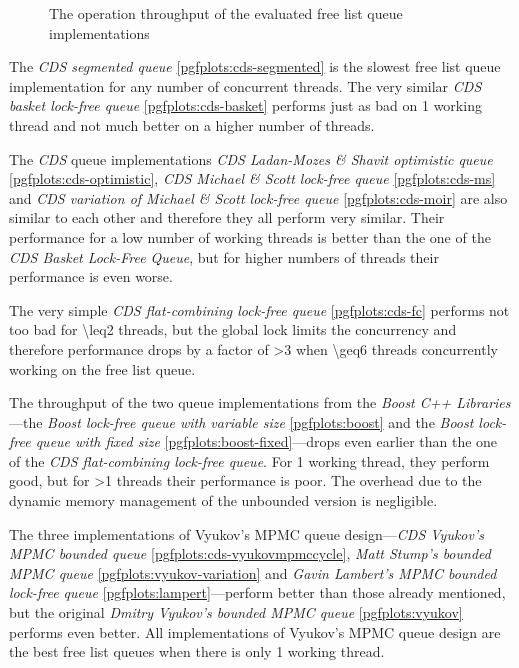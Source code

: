 \begin{@empty}
\begin{figure}[ht!]
{
        }
        \caption{The operation throughput of the evaluated free list queue implementations}
        \label{fig:free_list_performance}
    \end{figure}

    The \emph{CDS segmented queue} \ref{pgfplots:cds-segmented} is the slowest free list queue implementation for any number of concurrent threads. The very similar \emph{CDS basket lock-free queue} \ref{pgfplots:cds-basket} performs just as bad on \num{1} working thread and not much better on a higher number of threads.

    The \emph{CDS} queue implementations \emph{CDS Ladan-Mozes \& Shavit optimistic queue} \ref{pgfplots:cds-optimistic}, \emph{CDS Michael \& Scott lock-free queue} \ref{pgfplots:cds-ms} and \emph{CDS variation of Michael \& Scott lock-free queue} \ref{pgfplots:cds-moir} are also similar to each other and therefore they all perform very similar. Their performance for a low number of working threads is better than the one of the \emph{CDS Basket Lock-Free Queue}, but for higher numbers of threads their performance is even worse.

    The very simple \emph{CDS flat-combining lock-free queue} \ref{pgfplots:cds-fc} performs not too bad for \num{\leq2} threads, but the global lock limits the concurrency and therefore performance drops by a factor of \num{>3} when \num{\geq6} threads concurrently working on the free list queue.

    The throughput of the two queue implementations from the \textit{Boost C++ Libraries}---the \emph{Boost lock-free queue with variable size} \ref{pgfplots:boost} and the \emph{Boost lock-free queue with fixed size} \ref{pgfplots:boost-fixed}---drops even earlier than the one of the \emph{CDS flat-combining lock-free queue}. For \num{1} working thread, they perform good, but for \num{>1} threads their performance is poor. The overhead due to the dynamic memory management of the unbounded version is negligible.

    The three implementations of Vyukov's MPMC queue design---\emph{CDS Vyukov's MPMC bounded queue} \ref{pgfplots:cds-vyukovmpmccycle}, \emph{Matt Stump's bounded MPMC queue} \ref{pgfplots:vyukov-variation} and \emph{Gavin Lambert's MPMC bounded lock-free queue} \ref{pgfplots:lampert}---perform better than those already mentioned, but the original \emph{Dmitry Vyukov's bounded MPMC queue} \ref{pgfplots:vyukov} performs even better. All implementations of Vyukov's MPMC queue design are the best free list queues when there is only \num{1} working thread.


\end{@empty}

